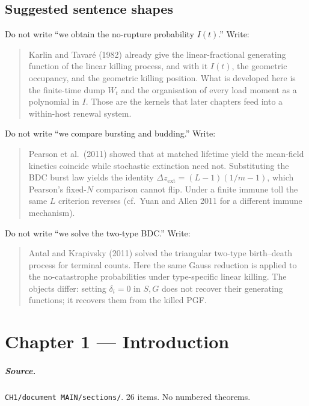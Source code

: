 \documentclass[11pt,a4paper]{report}
\begin{document}
\section{Suggested sentence shapes}
\label{sec:sentences}

Do not write ``we obtain the no-rupture probability \(I(t)\).'' Write:

\begin{quote}
Karlin and Tavar\'e (1982) already give the linear-fractional generating
function of the linear killing process, and with it \(I(t)\), the
geometric occupancy, and the geometric killing position. What is
developed here is the finite-time dump \(W_t\) and the organisation of
every load moment as a polynomial in \(I\). Those are the kernels that
later chapters feed into a within-host renewal system.
\end{quote}

Do not write ``we compare bursting and budding.'' Write:

\begin{quote}
Pearson et al.\ (2011) showed that at matched lifetime yield the
mean-field kinetics coincide while stochastic extinction need not.
Substituting the BDC burst law yields the identity
\(\Delta z_{\mathrm{ext}}=(L-1)(1/m-1)\), which Pearson's fixed-\(N\)
comparison cannot flip. Under a finite immune toll the same \(L\)
criterion reverses (cf.\ Yuan and Allen 2011 for a different immune
mechanism).
\end{quote}

Do not write ``we solve the two-type BDC.'' Write:

\begin{quote}
Antal and Krapivsky (2011) solved the triangular two-type birth--death
process for terminal counts. Here the same Gauss reduction is applied to
the no-catastrophe probabilities under type-specific linear killing. The
objects differ: setting \(\delta_i=0\) in \(S,G\) does not recover their
generating functions; it recovers them from the killed PGF.
\end{quote}

\chapter{Chapter 1 --- Introduction}
\label{ch:1}

\paragraph{Source.} \texttt{CH1/document MAIN/sections/}.
26 items. No numbered theorems.
\end{document}
